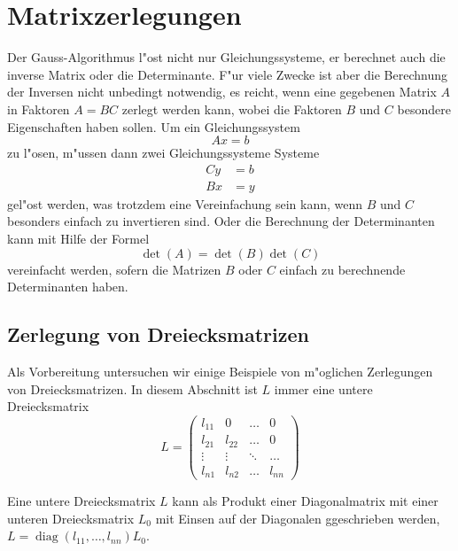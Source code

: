 %
%
%
\chapter{Matrixzerlegungen\label{chapter-zerlegung}}
Der Gauss-Algorithmus l"ost nicht nur Gleichungssysteme, er berechnet
auch die inverse Matrix oder die Determinante.
F"ur viele Zwecke ist
aber die Berechnung der Inversen nicht unbedingt notwendig, es reicht,
wenn eine gegebenen Matrix $A$ in Faktoren $A=BC$ zerlegt werden kann,
wobei die Faktoren $B$ und $C$ besondere Eigenschaften haben sollen.
Um ein Gleichungssystem
\[
Ax=b
\]
zu l"osen, m"ussen dann zwei Gleichungssysteme Systeme
\begin{align*}
Cy&=b\\
Bx&=y
\end{align*}
gel"ost werden, was trotzdem eine Vereinfachung sein kann, wenn
$B$ und $C$ besonders einfach zu invertieren sind.
Oder die Berechnung der Determinanten kann mit Hilfe der Formel
\[
\det(A)=\det(B)\det(C)
\]
vereinfacht werden, sofern die Matrizen $B$ oder $C$ einfach
zu berechnende Determinanten haben.

\section{Zerlegung von Dreiecksmatrizen}
Als Vorbereitung untersuchen wir einige Beispiele von m"oglichen
Zerlegungen von Dreiecksmatrizen.
In diesem Abschnitt ist $L$ immer eine untere Dreiecksmatrix
\[
L=\begin{pmatrix}
l_{11}&0     &\dots &0     \\
l_{21}&l_{22}&\dots &0     \\
\vdots&\vdots&\ddots&\dots \\
l_{n1}&l_{n2}&\dots &l_{nn}
\end{pmatrix}
\]
\begin{hilfssatz}
Eine untere Dreiecksmatrix $L$ kann als Produkt einer Diagonalmatrix
mit einer unteren Dreiecksmatrix $L_0$ mit Einsen auf der Diagonalen
ggeschrieben werden, $L=\operatorname{diag}(l_{11},\dots,l_{nn}) L_0$.
\end{hilfssatz}

